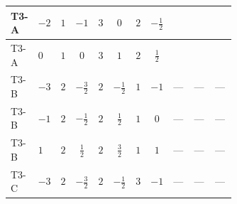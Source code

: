 \documentclass[8pt]{article}
\begin{document}
\begin{landscape}
\begin{longtable}{@{}llcccccc >{\raggedright\arraybackslash}p{0.21\linewidth} >{\raggedright\arraybackslash}p{0.21\linewidth} >{\raggedright\arraybackslash}p{0.21\linewidth}@{}}
\midrule
T3-A & $-2$ & $1$ & $-1$ & $3$ & $0$ & $2$ & $-\frac{1}{2}$ & \scriptsize\adjustbox{max width=\linewidth}{$\begin{gathered} {\lambda_{HS_2}^{(A)}} (2 T_{\nu}^{(2)}+6 \operatorname{Tr}\!\left({Y_d}\,\left({Y_d}\right)^{\dagger}\right)+2 \operatorname{Tr}\!\left({Y_e}\,\left({Y_e}\right)^{\dagger}\right)+6 \operatorname{Tr}\!\left({Y_u}\,\left({Y_u}\right)^{\dagger}\right)+16 {\lambda_{S_2}^{(A)}})\end{gathered}$} & \scriptsize\adjustbox{max width=\linewidth}{$\begin{gathered} +\frac{4}{3} \operatorname{Tr}\!\left({y_2}\,\left({y_2}\right)^{\dagger}\,{Y_e}\,\left({Y_e}\right)^{\dagger}\right)\end{gathered}$} & \scriptsize\adjustbox{max width=\linewidth}{$\begin{gathered} +\frac{8}{3} {\lambda_5} \left({\lambda_5}\right)^{*}\end{gathered}$} \\
\midrule
T3-A & $0$ & $1$ & $0$ & $3$ & $1$ & $2$ & $\frac{1}{2}$ & \scriptsize\adjustbox{max width=\linewidth}{$\begin{gathered} {\lambda_{HS_2}^{(A)}} (2 T_{\nu}^{(2)}+6 \operatorname{Tr}\!\left({Y_d}\,\left({Y_d}\right)^{\dagger}\right)+2 \operatorname{Tr}\!\left({Y_e}\,\left({Y_e}\right)^{\dagger}\right)+6 \operatorname{Tr}\!\left({Y_u}\,\left({Y_u}\right)^{\dagger}\right)+16 {\lambda_{S_2}^{(A)}})\end{gathered}$} & \scriptsize\adjustbox{max width=\linewidth}{$\begin{gathered} +\frac{4}{3} \operatorname{Tr}\!\left({y_2}\,\left({y_2}\right)^{\dagger}\,{Y_e}\,\left({Y_e}\right)^{\dagger}\right)\end{gathered}$} & \scriptsize\adjustbox{max width=\linewidth}{$\begin{gathered} +\frac{8}{3} {\lambda_5} \left({\lambda_5}\right)^{*}\end{gathered}$} \\
\midrule
T3-B & $-3$ & $2$ & $-\frac{3}{2}$ & $2$ & $-\frac{1}{2}$ & $1$ & $-1$ & --- & --- & --- \\
\midrule
T3-B & $-1$ & $2$ & $-\frac{1}{2}$ & $2$ & $\frac{1}{2}$ & $1$ & $0$ & --- & --- & --- \\
\midrule
T3-B & $1$ & $2$ & $\frac{1}{2}$ & $2$ & $\frac{3}{2}$ & $1$ & $1$ & --- & --- & --- \\
\midrule
T3-C & $-3$ & $2$ & $-\frac{3}{2}$ & $2$ & $-\frac{1}{2}$ & $3$ & $-1$ & --- & --- & --- \\

\end{longtable}
\end{landscape}
\end{document}
